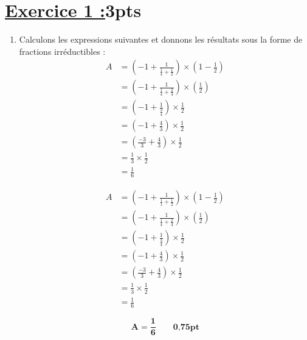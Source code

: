 \documentclass[12pt,a4paper]{article}
\begin{document}
\section*{\underline{Exercice 1 :}3pts}
\begin{enumerate}
\item Calculons les expressions suivantes et donnons les résultats sous la forme de fractions irréductibles :
\[
\begin{aligned}
    A &= \left( -1 + \frac{1}{\frac{1}{4} + \frac{1}{2}} \right) \times \left( 1 - \frac{1}{2} \right) \\[6pt]
    &= \left( -1 + \frac{1}{\frac{1}{4} + \frac{2}{4}} \right) \times \left( \frac{1}{2} \right) \\[6pt]
    &= \left( -1 + \frac{1}{\frac{3}{4}} \right) \times \frac{1}{2} \\[6pt]
    &= \left( -1 + \frac{4}{3} \right) \times \frac{1}{2} \\[6pt]
    &= \left( \frac{-3}{3} + \frac{4}{3} \right) \times \frac{1}{2} \\[6pt]
    &= \frac{1}{3} \times \frac{1}{2} \\[6pt]
    &= \frac{1}{6}
\end{aligned}
\]

\[
\begin{aligned}
    A &= \left( -1 + \frac{1}{\frac{1}{1} + \frac{1}{2}} \right) \times \left( 1 - \frac{1}{2} \right) \\[6pt]
    &= \left( -1 + \frac{1}{\frac{1}{4} + \frac{2}{4}} \right) \times \left( \frac{1}{2} \right) \\[6pt]
    &= \left( -1 + \frac{1}{\frac{3}{4}} \right) \times \frac{1}{2} \\[6pt]
    &= \left( -1 + \frac{4}{3} \right) \times \frac{1}{2} \\[6pt]
    &= \left( \frac{-3}{3} + \frac{4}{3} \right) \times \frac{1}{2} \\[6pt]
    &= \frac{1}{3} \times \frac{1}{2} \\[6pt]
    &= \frac{1}{6}
\end{aligned}
\]

\begin{tcolorbox}[colback=yellow!20, colframe=black, sharp corners]
    \[
    \mathbf{A = \frac{1}{6}}\quad\quad     \textbf{0,75pt}
    \]
\end{tcolorbox}


\end{enumerate}
\end{document}
